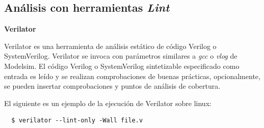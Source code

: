 \documentclass[a4paper]{article}
\begin{document}
\subsection{Análisis con herramientas \textit{Lint}}

\noindent\textbf{Verilator}

Verilator es una herramienta de análisis estático de código Verilog o SystemVerilog. Verilator se invoca con parámetros similares a \textit{gcc} o \textit{vlog} de Modelsim. El código Verilog o SystemVerilog sintetizable especificado como entrada es leído y se realizan comprobaciones de buenas prácticas, opcionalmente, se pueden insertar comprobaciones y puntos de análisis de cobertura.

\noindent El siguiente es un ejemplo de la ejecución de Verilator sobre linux:
\begin{lstlisting}
  $ verilator --lint-only -Wall file.v
\end{lstlisting}
        
\newpage


\end{document}
